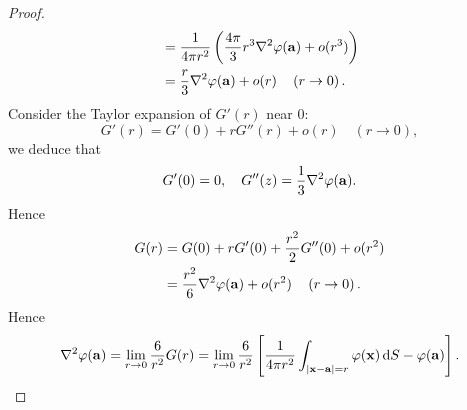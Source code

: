\begin{proof}
\begin{align*}
        &= \frac{1}{4\pi r^2}\left( \frac{4\pi}{3}r^3\laplacian \varphi(\mathbf{a})+ o(r^3) \right)\\ 
        &= \frac{r}{3}\laplacian \varphi(\mathbf{a})+o(r) \quad\left(r \to 0\right).
    \end{align*}
    Consider the Taylor expansion of $ G'(r) $ near 0:
    \[
        G'(r) = G'(0)+rG''(r)+o(r) \quad\left(r \to 0\right),
    \]
    we deduce that 
    \[
        G'(0)=0,\quad G''(z) = \frac{1}{3}\laplacian \varphi(\mathbf{a}).
    \]
    Hence 
    \begin{align*}
        G(r) &= G(0) + r G'(0) + \frac{r^2}{2}G''(0)+ o(r^2)\\ 
        &= \frac{r^2}{6}\laplacian \varphi(\mathbf{a}) + o(r^2) \quad\left(r \to 0\right).
    \end{align*}
    Hence 
    \[
        \laplacian\varphi(\mathbf{a}) = \lim_{r \to 0} \frac{6}{r^2}G(r)=\lim _{r \rightarrow 0} \frac{6}{r^{2}}\left[\frac{1}{4 \pi r^{2}} \int_{|\mathbf{x}-\mathbf{a}|=r} \varphi(\mathbf{x})\, \mathrm{d} S-\varphi(\mathbf{a})\right].\qedhere
    \]
\end{proof}

